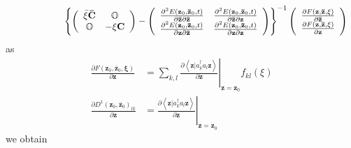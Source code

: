 \documentclass[aps,preprint]{revtex4}%
\begin{document}
\begin{align}
&  \quad\quad\quad\quad\quad\quad\left\{  \left(
\begin{array}
[c]{cc}%
\bar{\xi}\mathbf{\bar{C}} & \mathbb{O}\\
\mathbb{O} & -\xi\mathbf{C}%
\end{array}
\right)  -\left(
\begin{array}
[c]{cc}%
\frac{\partial^{2}E\left(  \mathbf{z}_{0},\mathbf{\bar{z}}_{0},t\right)
}{\partial\mathbf{\bar{z}}\partial\mathbf{\bar{z}}} & \frac{\partial
^{2}E\left(  \mathbf{z}_{0},\mathbf{\bar{z}}_{0},t\right)  }{\partial
\mathbf{\bar{z}}\partial\mathbf{z}}\\
\frac{\partial^{2}E\left(  \mathbf{z}_{0},\mathbf{\bar{z}}_{0},t\right)
}{\partial\mathbf{z}\partial\mathbf{\bar{z}}} & \frac{\partial^{2}E\left(
\mathbf{z}_{0},\mathbf{\bar{z}}_{0},t\right)  }{\partial\mathbf{z}%
\partial\mathbf{z}}%
\end{array}
\right)  \right\}  ^{-1}\left(
\begin{array}
[c]{c}%
\frac{\partial F\left(  \mathbf{z},\mathbf{\bar{z},\xi}\right)  }%
{\partial\mathbf{\bar{z}}}\\
\frac{\partial F\left(  \mathbf{z},\mathbf{\bar{z},\xi}\right)  }%
{\partial\mathbf{z}}%
\end{array}
\right)
\end{align}
as
\begin{align}
\frac{\partial F\left(  \mathbf{z}_{0},\mathbf{\bar{z}}_{0}\mathbf{,\xi
}\right)  }{\partial\mathbf{z}}  &  =\sum_{k,l}\left.  \frac{\partial
\left\langle \left.  \mathbf{z}\right\vert a_{k}^{\dag}a_{l}\mathbf{z}%
\right\rangle }{\partial\mathbf{z}}\right\vert _{\mathbf{z=z}_{0}}%
f_{kl}\left(  \xi\right) \\
\frac{\partial D^{1}\left(  \mathbf{z}_{0},\mathbf{\bar{z}}_{0}\right)  _{lk}%
}{\partial\mathbf{z}}  &  =\left.  \frac{\partial\left\langle \left.
\mathbf{z}\right\vert a_{k}^{\dag}a_{l}\mathbf{z}\right\rangle }%
{\partial\mathbf{z}}\right\vert _{\mathbf{z=z}_{0}}%
\end{align}
we obtain
\end{document}

